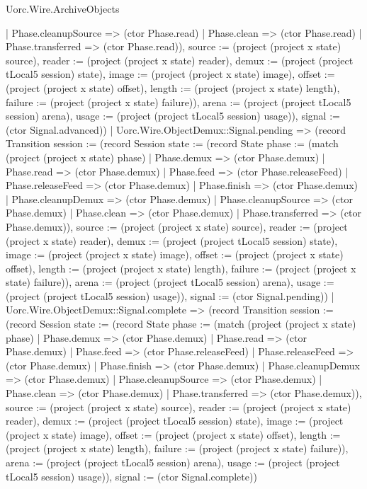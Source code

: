 \begin{lexlean}{Uorc.Wire.ArchiveObjects}
\begin{semanticmodule}
{{{{            | Phase.cleanupSource => (ctor Phase.read)
            | Phase.clean => (ctor Phase.read)
            | Phase.transferred => (ctor Phase.read)), source := (project (project x state) source), reader := (project (project x state) reader), demux := (project (project tLocal5 session) state), image := (project (project x state) image), offset := (project (project x state) offset), length := (project (project x state) length), failure := (project (project x state) failure)}), arena := (project (project tLocal5 session) arena), usage := (project (project tLocal5 session) usage)}), signal := (ctor Signal.advanced)})
          | Uorc.Wire.ObjectDemux::Signal.pending => (record Transition {session := (record Session {state := (record State {phase := (match (project (project x state) phase)
            | Phase.demux => (ctor Phase.demux)
            | Phase.read => (ctor Phase.demux)
            | Phase.feed => (ctor Phase.releaseFeed)
            | Phase.releaseFeed => (ctor Phase.demux)
            | Phase.finish => (ctor Phase.demux)
            | Phase.cleanupDemux => (ctor Phase.demux)
            | Phase.cleanupSource => (ctor Phase.demux)
            | Phase.clean => (ctor Phase.demux)
            | Phase.transferred => (ctor Phase.demux)), source := (project (project x state) source), reader := (project (project x state) reader), demux := (project (project tLocal5 session) state), image := (project (project x state) image), offset := (project (project x state) offset), length := (project (project x state) length), failure := (project (project x state) failure)}), arena := (project (project tLocal5 session) arena), usage := (project (project tLocal5 session) usage)}), signal := (ctor Signal.pending)})
          | Uorc.Wire.ObjectDemux::Signal.complete => (record Transition {session := (record Session {state := (record State {phase := (match (project (project x state) phase)
            | Phase.demux => (ctor Phase.demux)
            | Phase.read => (ctor Phase.demux)
            | Phase.feed => (ctor Phase.releaseFeed)
            | Phase.releaseFeed => (ctor Phase.demux)
            | Phase.finish => (ctor Phase.demux)
            | Phase.cleanupDemux => (ctor Phase.demux)
            | Phase.cleanupSource => (ctor Phase.demux)
            | Phase.clean => (ctor Phase.demux)
            | Phase.transferred => (ctor Phase.demux)), source := (project (project x state) source), reader := (project (project x state) reader), demux := (project (project tLocal5 session) state), image := (project (project x state) image), offset := (project (project x state) offset), length := (project (project x state) length), failure := (project (project x state) failure)}), arena := (project (project tLocal5 session) arena), usage := (project (project tLocal5 session) usage)}), signal := (ctor Signal.complete)})
}
\end{semanticmodule}
\end{lexlean}
